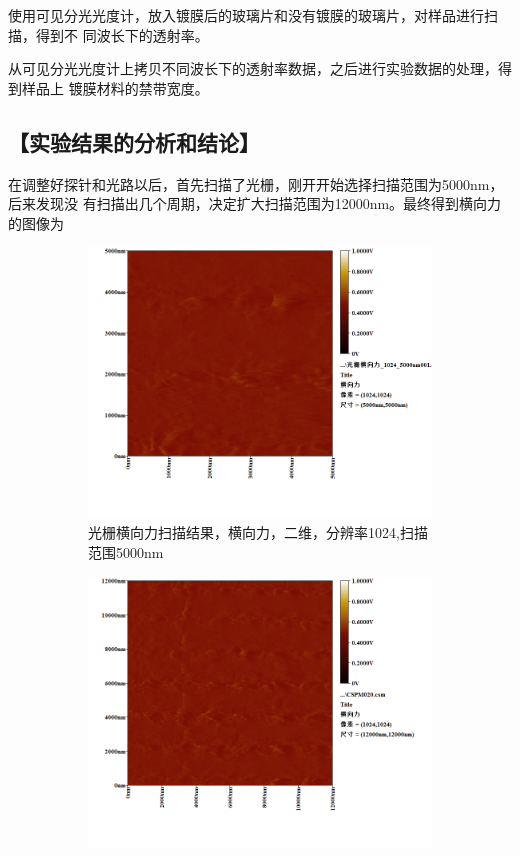 \documentclass{ctexart}
\let\oldsubsection\subsection
\renewcommand{\subsection}[1]{\oldsubsection{\!\!\!\!\!\!【#1】}}
\begin{document}
使用可见分光光度计，放入镀膜后的玻璃片和没有镀膜的玻璃片，对样品进行扫描，得到不
同波长下的透射率。

从可见分光光度计上拷贝不同波长下的透射率数据，之后进行实验数据的处理，得到样品上
镀膜材料的禁带宽度。

\subsection{实验结果的分析和结论}

在调整好探针和光路以后，首先扫描了光栅，刚开开始选择扫描范围为5000nm，后来发现没
有扫描出几个周期，决定扩大扫描范围为12000nm。最终得到横向力的图像为

\begin{figure}[H]
  \centering
  \begin{subfigure}{.49\textwidth}
    \centering
    \includegraphics[width=\linewidth]{AFM结果图像/光栅横向力_1024_5000nm}
    \caption{光栅横向力扫描结果，横向力，二维，分辨率1024,扫描范围5000nm}
  \end{subfigure}
  \begin{subfigure}{.49\textwidth}
    \centering
    \includegraphics[width=\linewidth]{AFM结果图像/光栅横向力_1024_12000nm}

\end{subfigure}
\end{figure}
\end{document}
